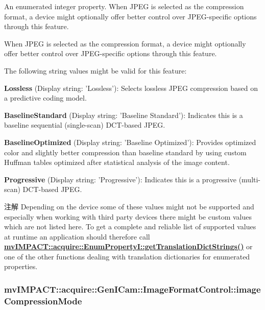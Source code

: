 An enumerated integer property. When J\+P\+E\+G is selected as the compression format, a device might optionally offer better control over J\+P\+E\+G-\/specific options through this feature. 

When J\+P\+E\+G is selected as the compression format, a device might optionally offer better control over J\+P\+E\+G-\/specific options through this feature.

The following string values might be valid for this feature\+:
\begin{DoxyItemize}
\item {\bfseries Lossless} (Display string\+: 'Lossless')\+: Selects lossless J\+P\+E\+G compression based on a predictive coding model.
\item {\bfseries Baseline\+Standard} (Display string\+: 'Baseline Standard')\+: Indicates this is a baseline sequential (single-\/scan) D\+C\+T-\/based J\+P\+E\+G.
\item {\bfseries Baseline\+Optimized} (Display string\+: 'Baseline Optimized')\+: Provides optimized color and slightly better compression than baseline standard by using custom Huffman tables optimized after statistical analysis of the image content.
\item {\bfseries Progressive} (Display string\+: 'Progressive')\+: Indicates this is a progressive (multi-\/scan) D\+C\+T-\/based J\+P\+E\+G.
\end{DoxyItemize}

\begin{DoxyNote}{注解}
Depending on the device some of these values might not be supported and especially when working with third party devices there might be custom values which are not listed here. To get a complete and reliable list of supported values at runtime an application should therefore call {\bfseries \hyperlink{classmv_i_m_p_a_c_t_1_1acquire_1_1_enum_property_i_a0ba6ccbf5ee69784d5d0b537924d26b6}{mv\+I\+M\+P\+A\+C\+T\+::acquire\+::\+Enum\+Property\+I\+::get\+Translation\+Dict\+Strings()}} or one of the other functions dealing with translation dictionaries for enumerated properties. 
\end{DoxyNote}
\hypertarget{classmv_i_m_p_a_c_t_1_1acquire_1_1_gen_i_cam_1_1_image_format_control_ab8c0807f112b80394f607bf8c7975bd9}{
\subsubsection[{image\+Compression\+Mode}]{ mv\+I\+M\+P\+A\+C\+T\+::acquire\+::\+Gen\+I\+Cam\+::\+Image\+Format\+Control\+::image\+Compression\+Mode}}\label{classmv_i_m_p_a_c_t_1_1acquire_1_1_gen_i_cam_1_1_image_format_control_ab8c0807f112b80394f607bf8c7975bd9}


